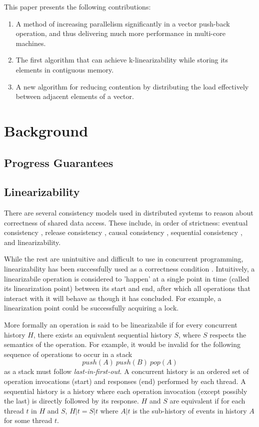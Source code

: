 \documentclass{sigplanconf}
\begin{document}
This paper presents the following contributions:
\begin{enumerate}
\item A method of increasing parallelism significantly in a vector push-back
operation, and thus delivering much more performance in multi-core
machines.
\item The first algorithm that can achieve k-linearizability while storing
its elements in contiguous memory.
\item A new algorithm for reducing contention by distributing the load effectively
between adjacent elements of a vector.
\end{enumerate}

\section{Background}


\subsection{Progress Guarantees}


\subsection{Linearizability}

There are several consistency models used in distributed systems to reason about correctness of shared data access. These include, in order of strictness: eventual consistency \cite{cm-eventual}, release consistency \cite{cm-release}, causal consistency \cite{cm-causal}, sequential consistency \cite{cm-sequential}, and linearizability.

While the rest are unintuitive and difficult to use in concurrent programming, linearizability has been successfully used as a correctness condition \cite{classic-linearizability}. Intuitively, a linearizabile operation is considered to 'happen' at a single point in time (called its linearization point) between its start and end, after which all operations that interact with it will behave as though it has concluded. For example, a linearization point could be successfully acquiring a lock.

More formally an operation is said to be linearizabile if for every concurrent history $H$, there exists an equivalent sequential history $S$, where $S$ respects the semantics of the operation. For example, it would be invalid for the following sequence of operations to occur in a stack
$$push(A)\ push(B)\ pop(A)$$
as a stack must follow \emph{last-in-first-out}.
A concurrent history is an ordered set of operation invocations (start) and responses (end) performed by each thread. A sequential history is a history where each operation invocation (except possibly the last) is directly followed by its response.
$H$ and $S$ are equivalent if for each thread $t$ in $H$ and $S$, $H \vert t = S \vert t$ where $A\vert t$ is the sub-history of events in history $A$ for some thread $t$.
\end{document}
